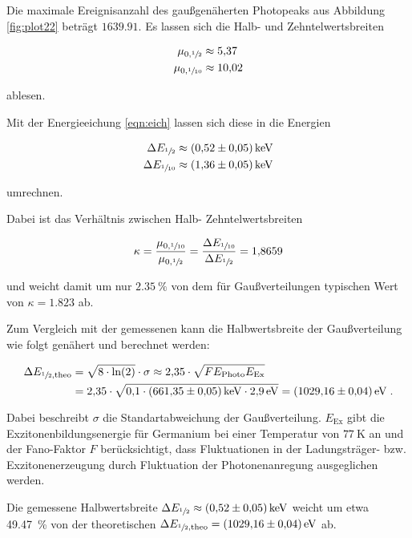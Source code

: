 Die maximale Ereignisanzahl des gaußgenäherten Photopeaks aus Abbildung \ref{fig:plot22} beträgt $\num{1639.91}$.
Es lassen sich die Halb- und Zehntelwertsbreiten 

\begin{align*}
  \mu_{0, \sfrac{1}{2}} &\approx \num{5.37} \\
  \mu_{0, \sfrac{1}{10}} &\approx \num{10.02}
\end{align*} 

ablesen.

Mit der Energieeichung \eqref{eqn:eich} lassen sich diese in die Energien

\begin{align*}
  \Delta E_{\sfrac{1}{2}} &\approx \SI{0.52 +- 0.05}{\kilo\eV} \\
  \Delta E_{\sfrac{1}{10}} &\approx \SI{1.36 +- 0.05}{\kilo\eV}
\end{align*}

umrechnen.

Dabei ist das Verhältnis zwischen Halb- Zehntelwertsbreiten

\begin{equation}
  \kappa = \frac{\mu_{0, \sfrac{1}{10}}}{\mu_{0, \sfrac{1}{2}}} = \frac{\Delta E_{\sfrac{1}{10}}}{\Delta E_{\sfrac{1}{2}}} = \num{1.8659}
\end{equation}

und weicht damit um nur $\SI{2.35}{\percent}$ von dem für Gaußverteilungen typischen Wert von $\kappa = \num{1.823}$ ab.

Zum Vergleich mit der gemessenen kann die Halbwertsbreite der Gaußverteilung wie folgt genähert und berechnet werden:

\begin{align}
  \Delta E_{\sfrac{1}{2}, \text{theo}} &= \sqrt{8 \cdot \text{ln}(2)} \cdot \sigma \approx \num{2.35} \cdot \sqrt{F E_\text{Photo} E_\text{Ex}} \\
  &= \num{2.35} \cdot \sqrt{\num{0.1}\cdot \SI{661.35 +- 0.05}{\kilo\eV} \cdot \SI{2.9}{\eV}} = \SI{1029.16 +- 0.04}{\eV} \; .
\end{align}

Dabei beschreibt $\sigma$ die Standartabweichung der Gaußverteilung. $E_\text{Ex}$ gibt die
Exzitonenbildungsenergie für Germanium bei einer Temperatur von $\SI{77}{\kelvin}$ an und der Fano-Faktor $F$
berücksichtigt, dass Fluktuationen in der Ladungsträger- bzw. Exzitonenerzeugung
durch Fluktuation der Photonenanregung ausgeglichen werden.

Die gemessene Halbwertsbreite $\Delta E_{\sfrac{1}{2}} \approx \SI{0.52 +- 0.05}{\kilo\eV}$ weicht um etwa
\SI{49.47}{\percent} von der theoretischen $\Delta E_{\sfrac{1}{2}, \text{theo}} = \SI{1029.16 +- 0.04}{\eV}$ ab.

